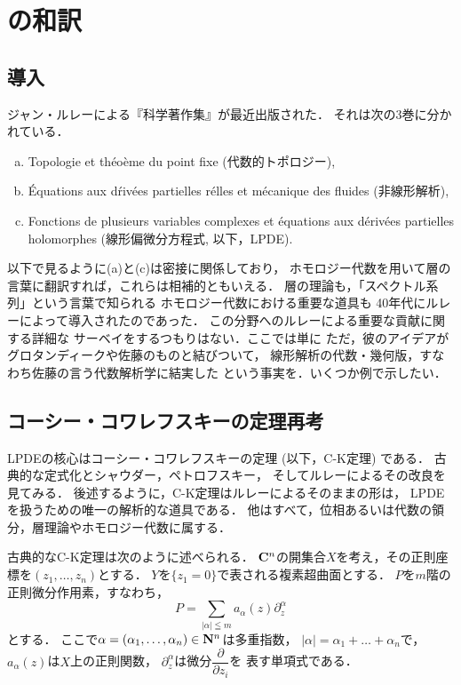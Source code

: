 \section{\cite[1--2章]{Sch14}の和訳}
\subsection{導入}
ジャン・ルレーによる『科学著作集』が最近出版された．
それは次の3巻に分かれている．
\begin{enumerate}[(a)]
    \item Topologie et th\'eo\`eme du point fixe (代数的トポロジー),
    \item \'Equations aux d\'riv\'ees partielles r\'elles et m\'ecanique des fluides (非線形解析),
    \item Fonctions de plusieurs variables complexes et 
    \'equations aux d\'eriv\'ees partielles holomorphes (線形偏微分方程式, 以下，LPDE).
\end{enumerate}

以下で見るように(a)と(c)は密接に関係しており，
ホモロジー代数を用いて層の言葉に翻訳すれば，これらは相補的ともいえる．
層の理論も，「スペクトル系列」という言葉で知られる
ホモロジー代数における重要な道具も
40年代にルレーによって導入されたのであった．
この分野へのルレーによる重要な貢献に関する詳細な
サーベイをするつもりはない．ここでは単に
ただ，彼のアイデアがグロタンディークや佐藤のものと結びついて，
線形解析の代数・幾何版，すなわち佐藤の言う代数解析学に結実した
という事実を．いくつか例で示したい．
\subsection{コーシー・コワレフスキーの定理再考}

LPDEの核心はコーシー・コワレフスキーの定理 (以下，C-K定理) である．
古典的な定式化とシャウダー，ペトロフスキー，
そしてルレーによるその改良を見てみる．
後述するように，C-K定理はルレーによるそのままの形は，
LPDEを扱うための唯一の解析的な道具である．
他はすべて，位相あるいは代数の領分，層理論やホモロジー代数に属する．

古典的なC-K定理は次のように述べられる．
\(\mathbf{C}^n\)の開集合\(X\)を考え，その正則座標を\((z_1,\dots,z_n)\)とする．
\(Y\)を\(\{z_1=0\}\)で表される複素超曲面とする．
\(P\)を\(m\)階の正則微分作用素，すなわち，
\[
    P=\sum_{\lvert \alpha\rvert\leqq m}
    a_\alpha(z)\partial_z^\alpha
\]
とする．
ここで\(\alpha=(\alpha_1,\dots,\alpha_n)\in\mathbf{N}^n\)は多重指数，
\(\lvert \alpha\rvert=\alpha_1+\dots+\alpha_n\)で，
\(a_\alpha(z)\)は\(X\)上の正則関数，
\(\partial_z^\alpha\)は微分\(\dfrac{\partial}{\partial z_i}\)を
表す単項式である．

